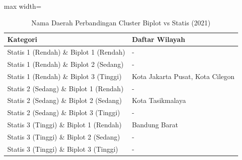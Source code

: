 \begin{table}[H]
\centering
\caption{Nama Daerah Perbandingan Cluster Biplot vs Statis (2021)} \label{tab:samplebiplot_statis_name_2021}
\begin{adjustbox}{max width=\textwidth}
\begin{tabular}{|p{4cm}|p{10cm}|}
\hline
\textbf{Kategori} & \textbf{Daftar Wilayah} \\
\hline
Statis 1 (Rendah) \& Biplot 1 (Rendah) & - \\
\hline
Statis 1 (Rendah) \& Biplot 2 (Sedang) & - \\
\hline
Statis 1 (Rendah) \& Biplot 3 (Tinggi) & Kota Jakarta Pusat, Kota Cilegon \\
\hline
Statis 2 (Sedang) \& Biplot 1 (Rendah) & - \\
\hline
Statis 2 (Sedang) \& Biplot 2 (Sedang) & Kota Tasikmalaya \\
\hline
Statis 2 (Sedang) \& Biplot 3 (Tinggi) & - \\
\hline
Statis 3 (Tinggi) \& Biplot 1 (Rendah) & Bandung Barat \\
\hline
Statis 3 (Tinggi) \& Biplot 2 (Sedang) & - \\
\hline
Statis 3 (Tinggi) \& Biplot 3 (Tinggi) & - \\
\hline
\end{tabular}
\end{adjustbox}
\end{table}